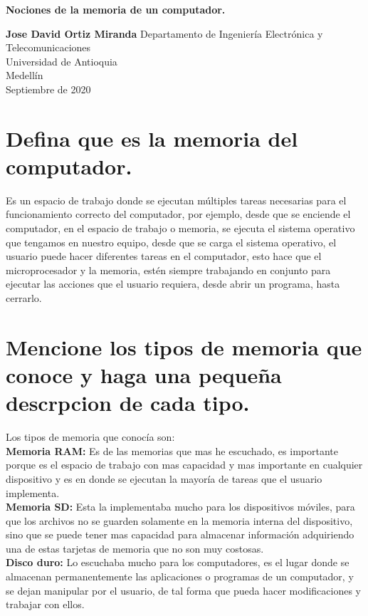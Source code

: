 \documentclass{article}
\begin{document}
\begin{titlepage}
    \begin{center}
        \vspace*{1cm}
            
        \Huge
        \textbf{Nociones de la memoria de un computador.}
            
        \vspace{0.5cm}
        \LARGE
        \textbf{Jose David Ortiz Miranda}
        \vfill
        \vspace{0.8cm}
        \Large
        Departamento de Ingeniería Electrónica y Telecomunicaciones\\
        Universidad de Antioquia\\
        Medellín\\
        Septiembre de 2020
            
    \end{center}
\end{titlepage}

\section{Defina que es la memoria del computador.} \label{contenido}
        \Large
        Es un espacio de trabajo donde se ejecutan múltiples tareas necesarias para el funcionamiento correcto del computador, por ejemplo, desde que se enciende el computador, en el espacio de trabajo o memoria, se ejecuta el sistema operativo que tengamos en nuestro equipo, desde que se carga el sistema operativo, el usuario puede hacer diferentes tareas en el computador, esto hace que el microprocesador y la memoria, estén siempre trabajando en conjunto para ejecutar las acciones que el usuario requiera, desde abrir un programa, hasta cerrarlo.
        
\section{Mencione los tipos de memoria que conoce y haga una pequeña descrpcion de cada tipo.} \label{contenido}
        \Large
        Los tipos de memoria que conocía son:\\
       \textbf{Memoria RAM:}
       Es de las memorias que mas he escuchado, es importante porque es el espacio de trabajo con mas capacidad y mas importante en cualquier dispositivo y es en donde se ejecutan la mayoría de tareas que el usuario implementa.\\
       \textbf{Memoria SD:}
       Esta la implementaba mucho para los dispositivos móviles, para que los archivos no se guarden solamente en la memoria interna del dispositivo, sino que se puede tener mas capacidad para almacenar información adquiriendo una de estas tarjetas de memoria que no son muy costosas.\\
       \textbf{Disco duro:}
       Lo escuchaba mucho para los computadores, es el lugar donde se almacenan permanentemente las aplicaciones o programas de un computador, y se dejan manipular por el usuario, de tal forma que pueda hacer modificaciones y trabajar con ellos.
\end{document}
